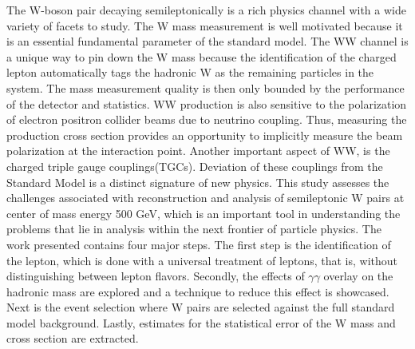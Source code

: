 The W-boson pair decaying semileptonically is a rich physics channel with a wide variety of facets to study. The W mass measurement is well motivated because it is an essential fundamental parameter of the standard model. The WW channel is a unique way to pin down the W mass because the identification of the charged lepton automatically tags the hadronic W as the remaining particles in the system. The mass measurement quality is then only bounded by the performance of the detector and statistics. WW production is also sensitive to the polarization of electron positron collider beams due to neutrino coupling. Thus,  measuring the production cross section provides an opportunity to implicitly measure the beam polarization at the interaction point. Another important aspect of WW, is the charged triple gauge couplings(TGCs). Deviation of these couplings from the Standard Model is a distinct signature of new physics. This study assesses the challenges associated with reconstruction and analysis of semileptonic W pairs at center of mass energy 500 GeV, which is an important tool in understanding the problems that lie in analysis within the next frontier of particle physics. The work presented contains four major steps. The first step is the identification of the lepton, which is done with a universal treatment of leptons, that is, without distinguishing between lepton flavors.  Secondly, the effects of $\gamma\gamma$ overlay on the hadronic mass are explored and a technique to reduce this effect is showcased. Next is the event selection where W pairs are selected against the full standard model background. Lastly, estimates for the statistical error of the W mass and cross section are extracted.